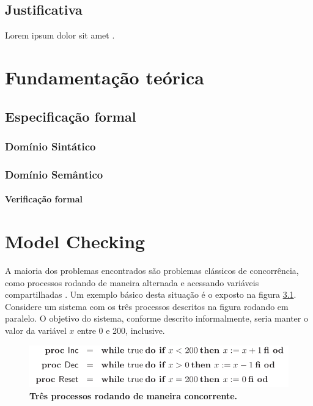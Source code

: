 \documentclass{utfpr-pg}
\begin{document}
\section{Justificativa}
\lipsum[4-7] Lorem ipsum dolor sit amet \cite{gummalla}.

\chapter{Fundamentação teórica}
\lipsum[2-4]

\section{Especificação formal}
\lipsum[7-9]
\subsection{Domínio Sintático}
\lipsum[10-11]
\subsection{Domínio Semântico}
\lipsum[12-15]
\subsubsection{Verificação formal}
\lipsum[16-17]
\lipsum[20-27]

\chapter{Model Checking}

A maioria dos problemas encontrados são problemas clássicos de concorrência, como processos rodando de maneira alternada e acessando variáveis compartilhadas \cite{Katoen08}. Um exemplo básico desta situação é o exposto na figura \ref{fig:interleaving}. Considere um sistema com os três processos descritos na figura rodando em paralelo. O objetivo do sistema, conforme descrito informalmente, seria manter o valor da variável $\mathit{x}$ entre 0 e 200, inclusive.
\begin{figure}[h]
  \centering
  \includegraphics[scale=.5]{interleaving.png}
  \caption{\textbf{Três processos rodando de maneira concorrente.}}
  \label{fig:interleaving}
\end{figure}
\end{document}
